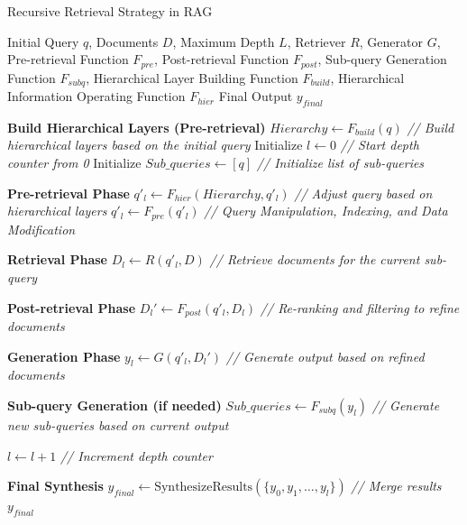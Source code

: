 \begin{algorithm}
	\caption{Recursive Retrieval Strategy in RAG}
	\label{alg:recursive_rag_workflow}
	\begin{algorithmic}[1]
		\REQUIRE Initial Query $q$, Documents $D$, Maximum Depth $L$, Retriever $R$, Generator $G$, Pre-retrieval Function $F_{pre}$, Post-retrieval Function $F_{post}$, Sub-query Generation Function $F_{subq}$, Hierarchical Layer Building Function $F_{build}$, Hierarchical Information Operating Function $F_{hier}$
		\ENSURE Final Output $y_{final}$
		
		\STATE \textbf{Build Hierarchical Layers (Pre-retrieval)}
		\STATE $Hierarchy \gets F_{build}(q)$ \hfill \textit{// Build hierarchical layers based on the initial query}
		\STATE Initialize $l \gets 0$ \hfill \textit{// Start depth counter from 0}
		\STATE Initialize $Sub\_queries \gets [q]$ \hfill \textit{// Initialize list of sub-queries}
		
		
		\STATE \textbf{Pre-retrieval Phase}
		\STATE $q'_l \gets F_{hier}(Hierarchy, q'_l)$ \hfill \textit{// Adjust query based on hierarchical layers}
		\STATE $q'_l \gets F_{pre}(q'_l)$ \hfill \textit{// Query Manipulation, Indexing, and Data Modification}
		
		\STATE \textbf{Retrieval Phase}
		\STATE $D_{l} \gets R(q'_l, D)$ \hfill \textit{// Retrieve documents for the current sub-query}
		
		\STATE \textbf{Post-retrieval Phase}
		\STATE $D_{l}' \gets F_{post}(q'_l, D_{l})$ \hfill \textit{// Re-ranking and filtering to refine documents}
		
		\STATE \textbf{Generation Phase}
		\STATE $y_{l} \gets G(q'_l, D_{l}')$ \hfill \textit{// Generate output based on refined documents}
		
		\STATE \textbf{Sub-query Generation (if needed)}
		\STATE $Sub\_queries \gets F_{subq}(y_{l})$ \hfill \textit{// Generate new sub-queries based on current output}
		\ENDIF
		\ENDFOR
		
		\STATE $l \gets l + 1$ \hfill \textit{// Increment depth counter}
		\ENDWHILE
		
		\STATE \textbf{Final Synthesis}
		\STATE $y_{final} \gets \text{SynthesizeResults}(\{y_{0}, y_{1}, \dots, y_{l}\})$ \hfill \textit{// Merge results}
		\RETURN $y_{final}$
		
	\end{algorithmic}
\end{algorithm}



